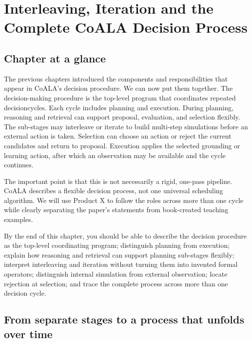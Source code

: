 \chapter{Interleaving, Iteration and the Complete CoALA Decision Process}
\label{ch:complete-coala-decision-process}

\section*{Chapter at a glance}
{}

The previous chapters introduced the components and responsibilities that appear in CoALA's decision procedure. We can now put them together. The decision-making procedure is the top-level program that coordinates repeated \glspl{decisioncycle}. Each cycle includes planning and execution. During planning, reasoning and retrieval can support proposal, evaluation, and selection flexibly. The sub-stages may interleave or iterate to build multi-step simulations before an external action is taken. Selection can choose an action or reject the current candidates and return to proposal. Execution applies the selected grounding or learning action, after which an observation may be available and the cycle continues.

The important point is that this is not necessarily a rigid, one-pass pipeline. CoALA describes a flexible decision process, not one universal scheduling algorithm. We will use Product X to follow the roles across more than one cycle while clearly separating the paper's statements from book-created teaching examples.

\begin{learningbox}
By the end of this chapter, you should be able to describe the decision procedure as the top-level coordinating program; distinguish planning from execution; explain how reasoning and retrieval can support planning sub-stages flexibly; interpret interleaving and iteration without turning them into invented formal operators; distinguish internal simulation from external observation; locate rejection at selection; and trace the complete process across more than one decision cycle.
\end{learningbox}

\section{From separate stages to a process that unfolds over time}
\label{sec:process-over-time}

